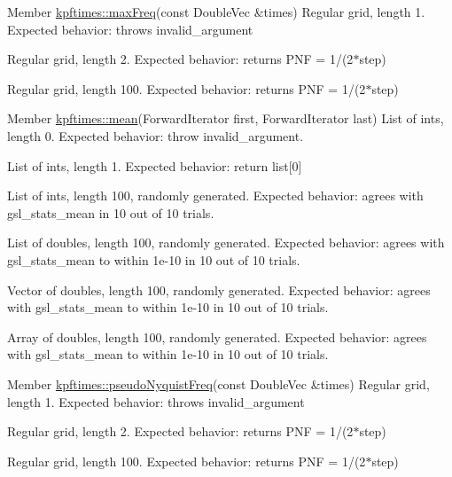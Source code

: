 \begin{DoxyDescription}
\item[Member \hyperlink{group__grid_gae62bc6f792fbbc2447cb85dbac341c5f}{kpftimes::maxFreq}(const DoubleVec \&times) ]Regular grid, length 1. Expected behavior: throws invalid\_\-argument 

Regular grid, length 2. Expected behavior: returns PNF = 1/(2$\ast$step) 

Regular grid, length 100. Expected behavior: returns PNF = 1/(2$\ast$step) 
\end{DoxyDescription}

\label{test__test000010}
\hypertarget{test__test000010}{}
 
\begin{DoxyDescription}
\item[Member \hyperlink{group__util_ga4a69dd17d28119657d408b8d26931681}{kpftimes::mean}(ForwardIterator first, ForwardIterator last) ]List of ints, length 0. Expected behavior: throw invalid\_\-argument. 

List of ints, length 1. Expected behavior: return list\mbox{[}0\mbox{]} 

List of ints, length 100, randomly generated. Expected behavior: agrees with gsl\_\-stats\_\-mean in 10 out of 10 trials. 

List of doubles, length 100, randomly generated. Expected behavior: agrees with gsl\_\-stats\_\-mean to within 1e-\/10 in 10 out of 10 trials. 

Vector of doubles, length 100, randomly generated. Expected behavior: agrees with gsl\_\-stats\_\-mean to within 1e-\/10 in 10 out of 10 trials. 

Array of doubles, length 100, randomly generated. Expected behavior: agrees with gsl\_\-stats\_\-mean to within 1e-\/10 in 10 out of 10 trials. 
\end{DoxyDescription}

\label{test__test000002}
\hypertarget{test__test000002}{}
 
\begin{DoxyDescription}
\item[Member \hyperlink{group__util_ga4b6ecddd43b6c6caf1d0db59b4a0b613}{kpftimes::pseudoNyquistFreq}(const DoubleVec \&times) ]Regular grid, length 1. Expected behavior: throws invalid\_\-argument 

Regular grid, length 2. Expected behavior: returns PNF = 1/(2$\ast$step) 

Regular grid, length 100. Expected behavior: returns PNF = 1/(2$\ast$step) 
\end{DoxyDescription}

